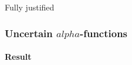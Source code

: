 \documentclass{beamer}
\begin{document}
\begin {frame}{Fully justified}
\frametitle{Uncertain $alpha$-functions}
\framesubtitle{Result}
\end{frame}

\end{document}
